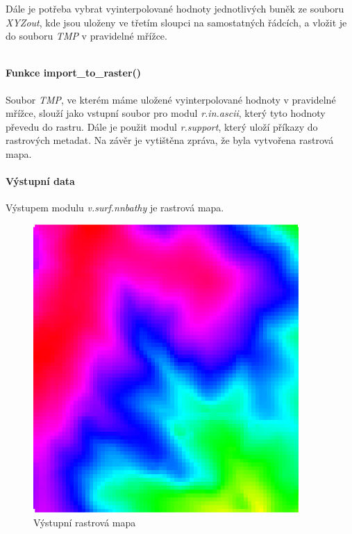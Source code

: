 \documentclass[12pt,a4paper]{article}
\begin{document}
Dále je potřeba vybrat vyinterpolované hodnoty jednotlivých buněk ze souboru \textit{XYZout}, kde jsou uloženy ve třetím sloupci na samostatných řádcích, a vložit je do souboru \textit{TMP} v pravidelné mřížce.

\begin{lstlisting}
\end{lstlisting}

\paragraph{Funkce import\_to\_raster()}
Soubor \textit{TMP}, ve kterém máme uložené vyinterpolované hodnoty v pravidelné mřížce, slouží jako vstupní soubor pro modul \textit{r.in.ascii}, který tyto hodnoty převedu do rastru. Dále je použit modul \textit{r.support}, který uloží příkazy do rastrových metadat. Na závěr je vytištěna zpráva, že byla vytvořena rastrová mapa.


\paragraph{Výstupní data}
Výstupem modulu \textit{v.surf.nnbathy} je rastrová mapa.
\begin{figure}[h!]
\centering
\includegraphics[width=0.9\textwidth]{../img/vystup_rast_map.png}
\caption{Výstupní rastrová mapa}
\label{fig:vystup_rast_map}
\end{figure}
\end{document}
